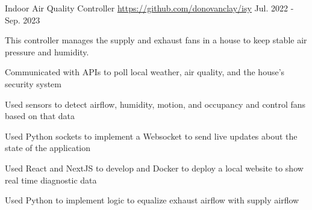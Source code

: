 \vspace{\sectionpadding}
\entry
    {Indoor Air Quality Controller}
    {\quad \href{https://github.com/donovanclay/isy}{https://github.com/donovanclay/isy}}
    {Jul. 2022 - Sep. 2023}
    {
        This controller manages the supply and exhaust fans in a house to keep stable air pressure and humidity.
        \begin{condenseditemize}
            \item Communicated with APIs to poll local weather, air quality, and the house's security system

            \item Used sensors to detect airflow, humidity, motion, and occupancy and control fans based on that data
            
            \item Used Python sockets to implement a Websocket to send live updates about the state of the application
            
            \item Used React and NextJS to develop and Docker to deploy a local website to show real time diagnostic data
            
            \item Used Python to implement logic to equalize exhaust airflow with supply airflow
        \end{condenseditemize}
    }

        

